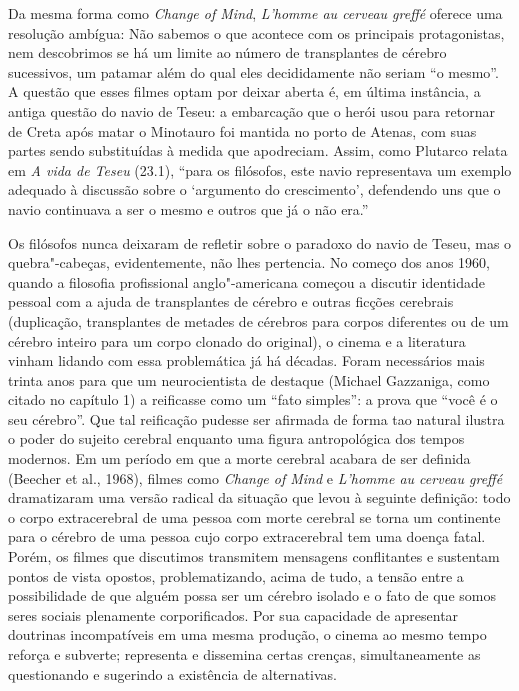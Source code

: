 Da mesma forma como \emph{Change of Mind}, \emph{L'homme au cerveau
greffé} oferece uma resolução ambígua: Não sabemos o que acontece com os
principais protagonistas, nem descobrimos se há um limite ao número de
transplantes de cérebro sucessivos, um patamar além do qual eles
decididamente não seriam ``o mesmo''. A questão que esses filmes optam
por deixar aberta é, em última instância, a antiga questão do navio de
Teseu: a embarcação que o herói usou para retornar de Creta após matar o
Minotauro foi mantida no porto de Atenas, com suas partes sendo
substituídas à medida que apodreciam. Assim, como Plutarco relata em
\emph{A vida de Teseu} (23.1), ``para os filósofos, este navio
representava um exemplo adequado à discussão sobre o `argumento do
crescimento', defendendo uns que o navio continuava a ser o mesmo e
outros que já o não era.''

Os filósofos nunca deixaram de refletir sobre o paradoxo do navio de
Teseu, mas o quebra"-cabeças, evidentemente, não lhes pertencia. No
começo dos anos 1960, quando a filosofia profissional anglo"-americana
começou a discutir identidade pessoal com a ajuda de transplantes de
cérebro e outras ficções cerebrais (duplicação, transplantes de metades
de cérebros para corpos diferentes ou de um cérebro inteiro para um
corpo clonado do original), o cinema e a literatura vinham lidando com
essa problemática já há décadas. Foram necessários mais trinta anos para
que um neurocientista de destaque (Michael Gazzaniga, como citado no
capítulo 1) a reificasse como um ``fato simples'': a prova que ``você é
o seu cérebro''. Que tal reificação pudesse ser afirmada de forma tao
natural ilustra o poder do sujeito cerebral enquanto uma figura
antropológica dos tempos modernos. Em um período em que a morte cerebral
acabara de ser definida (Beecher et al., 1968), filmes como \emph{Change
of Mind} e \emph{L'homme au cerveau greffé} dramatizaram uma versão
radical da situação que levou à seguinte definição: todo o corpo
extracerebral de uma pessoa com morte cerebral se torna um continente
para o cérebro de uma pessoa cujo corpo extracerebral tem uma doença
fatal. Porém, os filmes que discutimos transmitem mensagens conflitantes
e sustentam pontos de vista opostos, problematizando, acima de tudo, a
tensão entre a possibilidade de que alguém possa ser um cérebro isolado
e o fato de que somos seres sociais plenamente corporificados. Por sua
capacidade de apresentar doutrinas incompatíveis em uma mesma produção,
o cinema ao mesmo tempo reforça e subverte; representa e dissemina
certas crenças, simultaneamente as questionando e sugerindo a existência
de alternativas.

